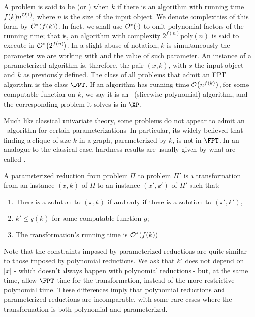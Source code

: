 A problem is said to be  (or \FPT) when  $k$ if there is an algorithm with running time $f(k)n^{\mathcal{O}\!\left(1\right)}$, where $n$ is the size of the input object.
We denote complexities of this form by $\mathcal{O}^*\!\left(f(k)\right)$.
In fact, we shall use $\mathcal{O}^*\!\left(\cdot\right)$ to omit polynomial factors of the running time; that is, an algorithm with complexity $2^{f(n)}\text{poly}(n)$ is said to execute in $\mathcal{O}^*\!\left(2^{f(n)}\right)$.
In a slight abuse of notation, $k$ is simultaneously the parameter we are working with and the value of such parameter.
An instance of a parameterized algorithm is, therefore, the pair $(x,k)$, with $x$ the input object and $k$ as previously defined.
The class of all problems that admit an FPT algorithm is the class $\FPT$.
If an algorithm has running time $\mathcal{O}\!\left(n^{f(k)}\right)$, for some computable function on $k$,  we say it is an \XP\ (slicewise polynomial) algorithm, and the corresponding problem it solves is in $\XP$. 

Much like classical univariate theory, some problems do not appear to admit an \FPT\ algorithm for certain parameterizations. In particular, its widely believed that finding a clique of size $k$ in a graph, parameterized by $k$, is not in $\FPT$.
In an analogue to the classical case, hardness results are usually given by what are called .

\begin{class_definition*}
    A parameterized reduction from problem $\Pi$ to problem $\Pi'$ is a transformation from an instance $(x, k)$ of $\Pi$ to an instance $(x',k')$ of $\Pi'$ such that:
    \begin{enumerate}
        \item There is a solution to $(x,k)$ if and only if there is a solution to $(x',k')$;
        \item $k' \leq g(k)$ for some computable function $g$;
        \item The transformation's running time is $\mathcal{O}^*\!\left(f(k)\right)$.
    \end{enumerate}
\end{class_definition*}

Note that the constraints imposed by parameterized reductions are quite similar to those imposed by polynomial reductions.
We ask that $k'$ does not depend on $|x|$ - which doesn't always happen with polynomial reductions - but, at the same time, allow $\FPT$ time for the transformation, instead of the more restrictive polynomial time.
These differences imply that polynomial reductions and parameterized reductions are incomparable, with some rare cases where the transformation is both polynomial and parameterized.

